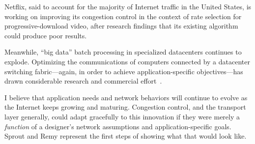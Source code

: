 Netflix, said to account for the majority of Internet traffic in the
United States, is working on improving its congestion control in the
context of rate selection for progressive-download video, after
research findings that its existing algorithm could produce poor results.~\cite{huang2012confused}

Meanwhile, ``big data'' batch processing in specialized datacenters
continues to explode. Optimizing the communications of computers
connected by a datacenter switching fabric---again, in order to
achieve application-specific objectives---has drawn considerable
research and commercial effort~\cite{dctcp, pfabric}.

I believe that application needs and network behaviors will continue
to evolve as the Internet keeps growing and maturing. Congestion
control, and the transport layer generally, could adapt gracefully to
this innovation if they were merely a \emph{function} of a designer's
network assumptions and application-specific goals. Sprout and Remy
represent the first steps of showing what that would look
like.
